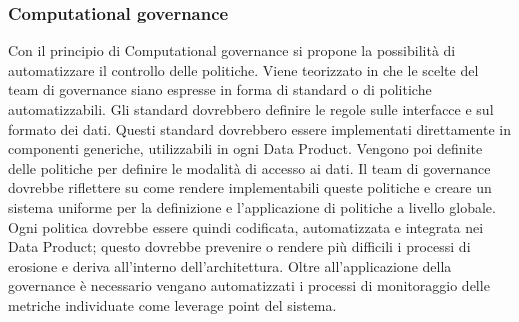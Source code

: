 \documentclass[12pt]{report}
\begin{document}
\subsubsection{Computational governance}
Con il principio di Computational governance si propone la possibilità di automatizzare il controllo delle politiche.
Viene teorizzato in \cite{dehghani_data_2022} che le scelte del team di governance siano espresse in forma di standard o di politiche automatizzabili.
Gli standard dovrebbero definire le regole sulle interfacce e sul formato dei dati. 
Questi standard dovrebbero essere implementati direttamente in componenti generiche, utilizzabili in ogni Data Product.
Vengono poi definite delle politiche per definire le modalità di accesso ai dati.
Il team di governance dovrebbe riflettere su come rendere implementabili queste politiche e creare un sistema uniforme per la definizione e l'applicazione di politiche a livello globale. 
Ogni politica dovrebbe essere quindi codificata, automatizzata e integrata nei Data Product; questo dovrebbe prevenire o rendere più difficili i processi di erosione e deriva all'interno dell'architettura.
Oltre all'applicazione della governance è necessario vengano automatizzati i processi di monitoraggio delle metriche individuate come leverage point del sistema.
\end{document}

